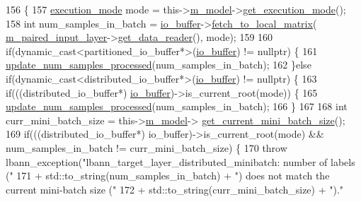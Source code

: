 \begin{DoxyCode}
156                              \{
157     \hyperlink{base_8hpp_a2781a159088df64ed7d47cc91c4dc0a8}{execution\_mode} mode = this->\hyperlink{classlbann_1_1Layer_a3d9315e99574166f2f33e37b572021d2}{m\_model}->\hyperlink{classlbann_1_1model_addb40597cf29aa6d31b6a7d09ef48608}{get\_execution\_mode}();
158     \textcolor{keywordtype}{int} num\_samples\_in\_batch = \hyperlink{classlbann_1_1generic__target__layer_a8da650b94f50cc63fc90cd792fa50c3f}{io\_buffer}->\hyperlink{classlbann_1_1generic__io__buffer_af9fc2100d41328fe399acf7bced950d7}{fetch\_to\_local\_matrix}(
      \hyperlink{classlbann_1_1generic__target__layer_a84da1260e9feb4fbc3e6f2315e4cab4b}{m\_paired\_input\_layer}->\hyperlink{classlbann_1_1generic__input__layer_a5715a966647e8cc92489f9e1950b2d28}{get\_data\_reader}(), mode);
159 
160     \textcolor{keywordflow}{if}(dynamic\_cast<partitioned\_io\_buffer*>(\hyperlink{classlbann_1_1generic__target__layer_a8da650b94f50cc63fc90cd792fa50c3f}{io\_buffer}) != \textcolor{keyword}{nullptr}) \{
161       \hyperlink{classlbann_1_1generic__target__layer_a0dbe5fc5203e15ddcf8348daf2f697c5}{update\_num\_samples\_processed}(num\_samples\_in\_batch);
162     \}\textcolor{keywordflow}{else} \textcolor{keywordflow}{if}(dynamic\_cast<distributed\_io\_buffer*>(\hyperlink{classlbann_1_1generic__target__layer_a8da650b94f50cc63fc90cd792fa50c3f}{io\_buffer}) != \textcolor{keyword}{nullptr}) \{
163       \textcolor{keywordflow}{if}(((distributed\_io\_buffer*) \hyperlink{classlbann_1_1generic__target__layer_a8da650b94f50cc63fc90cd792fa50c3f}{io\_buffer})->is\_current\_root(mode)) \{
165         \hyperlink{classlbann_1_1generic__target__layer_a0dbe5fc5203e15ddcf8348daf2f697c5}{update\_num\_samples\_processed}(num\_samples\_in\_batch);
166       \}
167 
168       \textcolor{keywordtype}{int} curr\_mini\_batch\_size = this->\hyperlink{classlbann_1_1Layer_a3d9315e99574166f2f33e37b572021d2}{m\_model}->
      \hyperlink{classlbann_1_1model_a3eaad8fd538b99ecab9afca6dc3327fd}{get\_current\_mini\_batch\_size}();
169       \textcolor{keywordflow}{if}(((distributed\_io\_buffer*) io\_buffer)->is\_current\_root(mode) && num\_samples\_in\_batch != 
      curr\_mini\_batch\_size) \{
170         \textcolor{keywordflow}{throw} lbann\_exception(\textcolor{stringliteral}{"lbann\_target\_layer\_distributed\_minibatch: number of labels ("}
171                               + std::to\_string(num\_samples\_in\_batch) + \textcolor{stringliteral}{") does not match the current
       mini-batch size ("}
172                               + std::to\_string(curr\_mini\_batch\_size) + \textcolor{stringliteral}{")."}

\end{DoxyCode}
